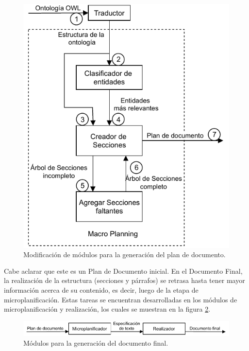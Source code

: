 \begin{figure}[H]
    \centering
    \includegraphics{img/generacion_documento/modulos_plan_documento.pdf}
    \caption{Modificación de módulos para la generación del plan de documento.}
    \label{fig:modulos_plan_documento}
\end{figure}

Cabe aclarar que este es un Plan de Documento inicial. En el Documento Final, la realización de la estructura (secciones y párrafos) se retrasa hasta tener mayor información acerca de su contenido, es decir, luego de la etapa de microplanificación. Estas tareas se encuentran desarrolladas en los módulos de microplanificación y realización, los cuales se muestran en la figura \ref{fig:modulos_documento_final}.

\begin{figure}[H]
    \centering
    \includegraphics[width=12cm]{img/generacion_documento/modulos_documento_final.pdf}
    \caption{Módulos para la generación del documento final.}
    \label{fig:modulos_documento_final}
\end{figure}

